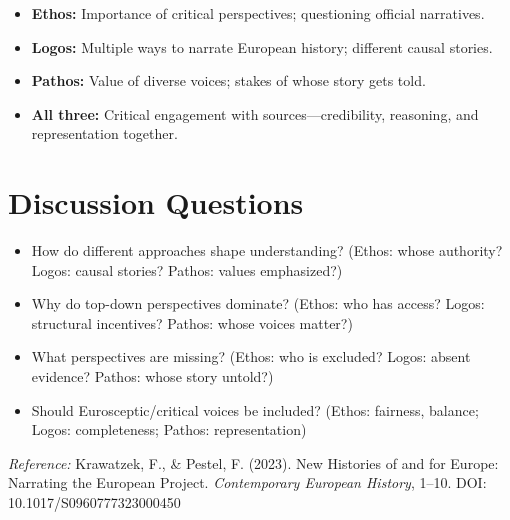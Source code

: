 \documentclass[11pt,a4paper]{article}
\begin{document}
\begin{itemize}
\item \textbf{Ethos:} Importance of critical perspectives; questioning official narratives.
\item \textbf{Logos:} Multiple ways to narrate European history; different causal stories.
\item \textbf{Pathos:} Value of diverse voices; stakes of whose story gets told.
\item \textbf{All three:} Critical engagement with sources---credibility, reasoning, and representation together.
\end{itemize}

\section*{Discussion Questions}

\begin{itemize}
\item How do different approaches shape understanding? (Ethos: whose authority? Logos: causal stories? Pathos: values emphasized?)
\item Why do top-down perspectives dominate? (Ethos: who has access? Logos: structural incentives? Pathos: whose voices matter?)
\item What perspectives are missing? (Ethos: who is excluded? Logos: absent evidence? Pathos: whose story untold?)
\item Should Eurosceptic/critical voices be included? (Ethos: fairness, balance; Logos: completeness; Pathos: representation)
\end{itemize}

\vspace{1em}
\noindent\footnotesize\textit{Reference:} Krawatzek, F., \& Pestel, F. (2023). New Histories of and for Europe: Narrating the European Project. \textit{Contemporary European History}, 1--10. DOI: 10.1017/S0960777323000450
\end{document}
